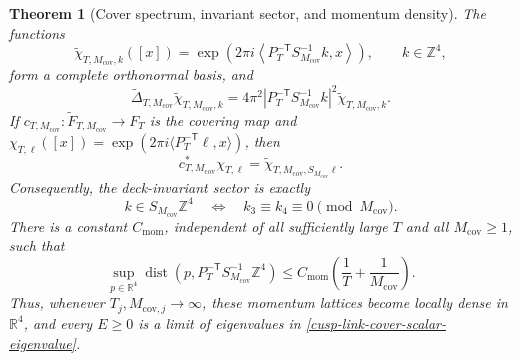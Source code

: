 \documentclass[11pt]{article}
\newtheorem{theorem}{Theorem}[section]
\theoremstyle{definition}
\numberwithin{equation}{section}
\begin{document}
\begin{theorem}[Cover spectrum, invariant sector, and momentum density]
\label{cusp-link-cover-spectrum}
The functions
\begin{equation}
 \widetilde\chi_{T,M_{\mathrm{cov}},k}([x])
 =\exp\!\left(
   2\pi i\left\langle
    P_T^{-\mathsf T}S_{M_{\mathrm{cov}}}^{-1}k,x
   \right\rangle\right),
 \qquad k\in\mathbb Z^4,
 \label{cusp-link-cover-characters}
\end{equation}
form a complete orthonormal basis, and
\begin{equation}
 \widetilde\Delta_{T,M_{\mathrm{cov}}}
 \widetilde\chi_{T,M_{\mathrm{cov}},k}
 =4\pi^2
  \left|P_T^{-\mathsf T}S_{M_{\mathrm{cov}}}^{-1}k\right|^2
  \widetilde\chi_{T,M_{\mathrm{cov}},k}.
 \label{cusp-link-cover-scalar-eigenvalue}
\end{equation}
If \(c_{T,M_{\mathrm{cov}}}:\widetilde F_{T,M_{\mathrm{cov}}}\to F_T\)
is the covering map and
\(\chi_{T,\ell}([x])=\exp(2\pi i\langle P_T^{-\mathsf T}\ell,x\rangle)\),
then
\begin{equation}
 c_{T,M_{\mathrm{cov}}}^*\chi_{T,\ell}
 =\widetilde\chi_{T,M_{\mathrm{cov}},S_{M_{\mathrm{cov}}}\ell}.
 \label{cusp-link-cover-character-pullback}
\end{equation}
Consequently, the deck-invariant sector is exactly
\begin{equation}
 k\in S_{M_{\mathrm{cov}}}\mathbb Z^4
 \quad\Longleftrightarrow\quad
 k_3\equiv k_4\equiv0\pmod {M_{\mathrm{cov}}}.
 \label{cusp-link-cover-deck-sector}
\end{equation}
There is a constant \(C_{\mathrm{mom}}\), independent of all sufficiently
large \(T\) and all \(M_{\mathrm{cov}}\ge1\), such that
\begin{equation}
 \sup_{p\in\mathbb R^4}\operatorname{dist}\!\left(
  p,P_T^{-\mathsf T}S_{M_{\mathrm{cov}}}^{-1}\mathbb Z^4
 \right)
 \le C_{\mathrm{mom}}\left(\frac1T+\frac1{M_{\mathrm{cov}}}\right).
 \label{cusp-link-cover-momentum-radius}
\end{equation}
Thus, whenever \(T_j,M_{\mathrm{cov},j}\to\infty\), these momentum lattices
become locally dense in \(\mathbb R^4\), and every \(E\ge0\) is a limit of
eigenvalues in \eqref{cusp-link-cover-scalar-eigenvalue}.
\end{theorem}
\end{document}

